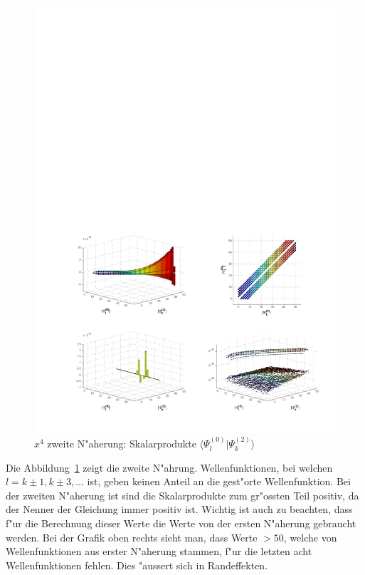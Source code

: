\begin{refsection}
\begin{figure}	%
\centering
\includegraphics[width=1.0\textwidth]{anharmonisch/images/x4/Stoerung2Skalare.pdf}
\caption{$x^4$ zweite N"aherung: Skalarprodukte $\langle\Psi_l^{(0)}|\Psi_k^{(2)}\rangle$
\label{skript:x4_Stoerung2Skalare}}
\end{figure}

Die Abbildung~\ref{skript:x4_Stoerung2Skalare} zeigt die zweite N"ahrung.
Wellenfunktionen, bei welchen $l=k\pm 1,k\pm 3,\dots$ ist,
geben keinen Anteil an die gest"orte Wellenfunktion.
Bei der zweiten N"aherung ist sind die Skalarprodukte zum gr"ossten Teil positiv,
da der Nenner der Gleichung immer positiv ist.
Wichtig ist auch zu beachten, dass f"ur die Berechnung dieser Werte die Werte von
der ersten N"aherung gebraucht werden.
Bei der Grafik oben rechts sieht man, dass Werte $>50$, welche von Wellenfunktionen
aus erster N"aherung stammen, f"ur die letzten acht Wellenfunktionen fehlen.
Dies "aussert sich in Randeffekten. 



\end{refsection}
